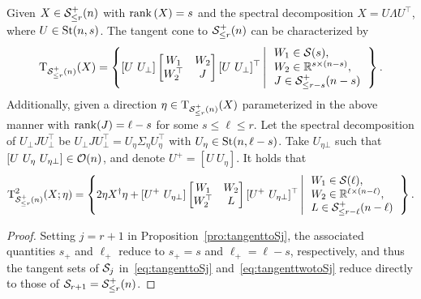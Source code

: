 \begin{proposition}\label{pro:tangenttoS+r}
    Given $X\in\mathcal{S}^+_{\le r}(n)$ with $\operatorname{rank}{(X)}=s$ and the spectral decomposition $X=U\varLambda U^\top$, where $U\in\mathrm{St}(n,s)$. The tangent cone to $\mathcal{S}^+_{\le r}(n)$ can be characterized by
    \begin{equation*}
        \Btangent_{\boundedranksdp(n)}(X)=\hkh{[U\ U_{\bot}]\left[ \begin{matrix}
        	W_1&		W_2\\
        	W_2^\top&		J\\
        \end{matrix} \right][U\ U_{\bot}]^\top \left|\,\begin{array}{l}
        W_1\in\sym(s),
        \\
        W_2\in\mbR^{s\times (n-s)},
        \\
        J\in\sym^+_{\le r-s}(n-s)
        \end{array}\right.
        }.
    \end{equation*}
    Additionally, given a direction $\eta\in\mathrm{T}_{\mathcal{S}^+_{\le r}(n)}(X)$ parameterized in the above manner with $\operatorname{rank}(J)=\ell-s$ for some $s\le\ell\le r$. Let the spectral decomposition of $U_\bot J U^\top_\bot$ be $U_\bot J U^\top_\bot=U_{\eta} \varSigma_\eta U_{\eta}^\top$ with $U_{\eta}\in\mathrm{St}(n,\ell-s)$. Take ${U}_{\eta\bot}$ such that $[U\ U_\eta\ U_{\eta\bot}]\in\orth(n)$, and denote $U^+=[U\ U_{\eta}]$. It holds that
    \begin{equation*}
        \mathrm{T}^2_{\mathcal{S}^+_{\le r}(n)}(X;\eta)=\left\{ {2\eta X^\dagger\eta + [U^+\ U_{\eta\bot}]\left[ \begin{matrix}
        	W_1&		W_2\\
        	W_2^\top&		L\\
        \end{matrix} \right][U^+\ U_{\eta\bot}]^\top \left|\,\begin{array}{l}
        W_1\in\mathcal{S}(\ell),
        \\
        W_2\in\mathbb{R}^{\ell\times (n-\ell)},
        \\
        L\in\mathcal{S}^+_{\le r-\ell}(n-\ell)
        \end{array}\right.
        } \right\}.
    \end{equation*}
\end{proposition}
\begin{proof}
Setting $j=r+1$ in Proposition~\ref{pro:tangenttoSj}, the associated quantities $s_+$ and $\ell_+$ reduce to $s_+=s$ and $\ell_+=\ell-s$, respectively, and thus the tangent sets of $\mathcal{S}_j$ in~\eqref{eq:tangenttoSj} and~\eqref{eq:tangenttwotoSj} reduce directly to those of $\mathcal{S}_{r+1}=\mathcal{S}^+_{\le r}(n)$.
\end{proof}

